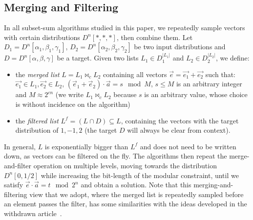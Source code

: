 

\subsection{Merging and Filtering}
\label{subsection:merging-filtering}

In all subset-sum algorithms studied in this paper, we repeatedly sample vectors with certain distributions $D^n[*, *, *]$, then combine them. Let $D_1 = D^n[\alpha_1, \beta_1, \gamma_1]$, $D_2 = D^n[\alpha_2, \beta_2, \gamma_2]$ be two input distributions and $D = D^n[\alpha, \beta, \gamma]$ be a target. Given two lists $L_1 \in D_1^{|L_1|}$ and $L_2 \in D_2^{|L_2|}$, we define:
\begin{itemize}
\item the \emph{merged list} $L = L_1 \bowtie_c L_2$ containing all vectors $\vec{e} = \vec{e_1} + \vec{e_2}$ such that: $\vec{e_1} \in L_1, \vec{e_2} \in L_2$, $(\vec{e}_1 + \vec{e}_2) \cdot \vec{a} = s \mod{M}$, $s \leq M$ is an arbitrary integer and $M \approx 2^{cn}$ (we write $L_1 \bowtie_c L_2$ because $s$ is an arbitrary value, whose choice is without incidence on the algorithm)
\item the \emph{filtered list} $L^f = (L \cap D) \subseteq L$, containing the vectors with the target distribution of $1, -1, 2$ (the target $D$ will always be clear from context).
\end{itemize}
In general, $L$ is exponentially bigger than $L^f$ and does not need to be written down, as vectors can be filtered on the fly. The algorithms then repeat the merge-and-filter operation on multiple levels, moving towards the distribution $D^n[0, 1/2]$ while increasing the bit-length of the modular constraint, until we satisfy $\vec{e} \cdot \vec{a} = t \mod{2^n}$ and obtain a solution. Note that this merging-and-filtering view that we adopt, where the merged list is repeatedly sampled before an element passes the filter, has some similarities with the ideas developed in the withdrawn article~\cite{DBLP:journals/corr/abs-1907-04295}.


